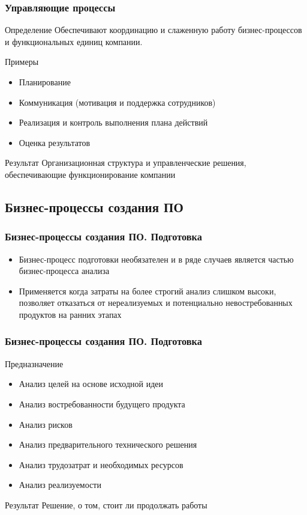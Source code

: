 \documentclass{../industrial-development}
\begin{document}
\begin{frame} \frametitle{Управляющие процессы}
	\begin{block}{Определение}
		Обеспечивают координацию и слаженную работу бизнес-процессов и функциональных единиц компании.
	\end{block}
	\begin{block}{Примеры}
		\begin{itemize}
		\item Планирование
		\item Коммуникация (мотивация и поддержка сотрудников)
		\item Реализация и контроль выполнения плана действий
		\item Оценка результатов
		\end{itemize}
	\end{block}
	\begin{block}{Результат}
		Организационная структура и управленческие решения, обеспечивающие функционирование компании
	\end{block}
\end{frame}
\lecturenotes


\subsection{Бизнес-процессы создания ПО}


\begin{frame} \frametitle{Бизнес-процессы создания ПО. Подготовка}
	\begin{itemize}
		\item Бизнес-процесс подготовки необязателен и в ряде случаев является частью бизнес-процесса анализа
		\item Применяется когда затраты на более строгий анализ слишком высоки, позволяет отказаться от нереализуемых и потенциально невостребованных продуктов на ранних этапах
	\end{itemize}
\end{frame}
\lecturenotes


\begin{frame} \frametitle{Бизнес-процессы создания ПО. Подготовка}
	\begin{block}{Предназначение}
		\begin{itemize}
			\item Анализ целей на основе исходной идеи
			\item Анализ востребованности будущего продукта
			\item Анализ рисков
			\item Анализ предварительного технического решения
			\item Анализ трудозатрат и необходимых ресурсов
			\item Анализ реализуемости
		\end{itemize}
	\end{block}
	\begin{block}{Результат}
		Решение, о том, стоит ли продолжать работы
	\end{block}
\end{frame}
\lecturenotes
\end{document}
